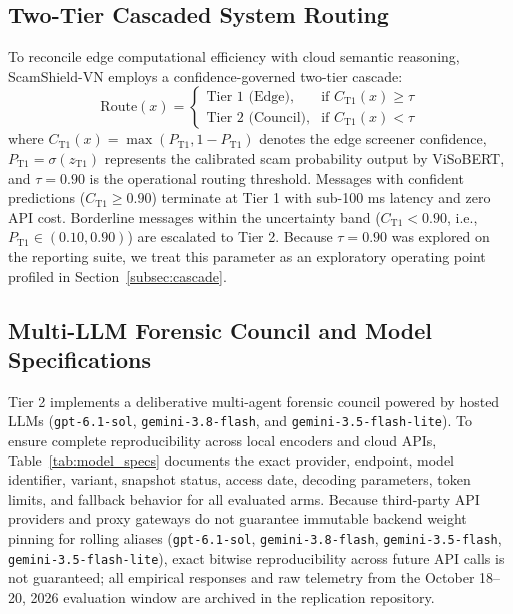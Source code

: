 \documentclass[journal]{IEEEtran}
\begin{document}
\subsection{Two-Tier Cascaded System Routing}
\label{subsec:routing}

To reconcile edge computational efficiency with cloud semantic reasoning, ScamShield-VN employs a confidence-governed two-tier cascade:
\begin{equation}
\label{eq:routing}
\text{Route}(x) = \begin{cases} 
\text{Tier 1 (Edge)}, & \text{if } C_{\text{T1}}(x) \ge \tau \\ 
\text{Tier 2 (Council)}, & \text{if } C_{\text{T1}}(x) < \tau 
\end{cases}
\end{equation}
where $C_{\text{T1}}(x) = \max(P_{\text{T1}}, 1 - P_{\text{T1}})$ denotes the edge screener confidence, $P_{\text{T1}} = \sigma(z_{\text{T1}})$ represents the calibrated scam probability output by ViSoBERT, and $\tau = 0.90$ is the operational routing threshold. Messages with confident predictions ($C_{\text{T1}} \ge 0.90$) terminate at Tier 1 with sub-100 ms latency and zero API cost. Borderline messages within the uncertainty band ($C_{\text{T1}} < 0.90$, i.e., $P_{\text{T1}} \in (0.10, 0.90)$) are escalated to Tier 2. Because $\tau = 0.90$ was explored on the reporting suite, we treat this parameter as an exploratory operating point profiled in Section~\ref{subsec:cascade}.

\subsection{Multi-LLM Forensic Council and Model Specifications}
\label{subsec:council}

Tier 2 implements a deliberative multi-agent forensic council powered by hosted LLMs (\texttt{gpt-6.1-sol}, \texttt{gemini-3.8-flash}, and \texttt{gemini-3.5-flash-lite}). To ensure complete reproducibility across local encoders and cloud APIs, Table~\ref{tab:model_specs} documents the exact provider, endpoint, model identifier, variant, snapshot status, access date, decoding parameters, token limits, and fallback behavior for all evaluated arms. Because third-party API providers and proxy gateways do not guarantee immutable backend weight pinning for rolling aliases (\texttt{gpt-6.1-sol}, \texttt{gemini-3.8-flash}, \texttt{gemini-3.5-flash}, \texttt{gemini-3.5-flash-lite}), exact bitwise reproducibility across future API calls is not guaranteed; all empirical responses and raw telemetry from the October 18--20, 2026 evaluation window are archived in the replication repository.
\end{document}
